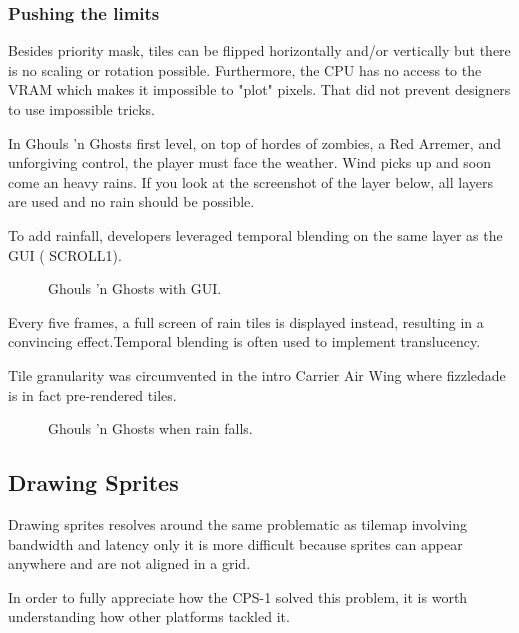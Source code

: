 \subsubsection{Pushing the limits}

Besides priority mask, tiles can be flipped horizontally and/or vertically but there is no scaling or rotation possible. Furthermore, the CPU has no access to the VRAM which makes it impossible to "plot" pixels. That did not prevent designers to use impossible tricks.



In Ghouls 'n Ghosts first level, on top of hordes of zombies, a Red Arremer, and unforgiving control, the player must face the weather. Wind picks up and soon come an heavy rains. If you look at the screenshot of the layer below, all layers are used and no rain should be possible.

To add rainfall, developers leveraged temporal blending on the same layer as the GUI ( SCROLL1). 

\vfill
\begin{figure}[!b]
 \caption*{Ghouls 'n Ghosts with GUI.}%
 \end{figure}%
\pagebreak

Every five frames, a full screen of rain tiles is displayed instead, resulting in a convincing effect.Temporal blending is often used to implement translucency. 

Tile granularity was circumvented in the intro Carrier Air Wing where fizzledade is in fact pre-rendered tiles.

 

\vfill
\begin{figure}[!b]
 \caption*{Ghouls 'n Ghosts when rain falls.}%
 \end{figure}%
\pagebreak




\subsection{Drawing Sprites}
Drawing sprites resolves around the same problematic as tilemap involving bandwidth and latency only it is more difficult because sprites can appear anywhere and are not aligned in a grid.

In order to fully appreciate how the CPS-1 solved this problem, it is worth understanding how other platforms tackled it.

